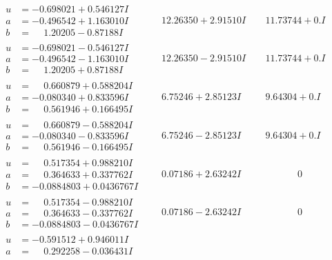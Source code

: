 \documentclass[1p]{elsarticle_modified}
\theoremstyle{definition}
\begin{document}
$$\begin{array}{c|c|c}
\begin{aligned}
u &= -0.698021 + 0.546127 I \\
a &= -0.496542 + 1.163010 I \\
b &= \phantom{-}1.20205 - 0.87188 I\end{aligned}
 & \phantom{-}12.26350 + 2.91510 I & \phantom{-}11.73744 + 0. I\phantom{ +0.000000I} \\ \hline\begin{aligned}
u &= -0.698021 - 0.546127 I \\
a &= -0.496542 - 1.163010 I \\
b &= \phantom{-}1.20205 + 0.87188 I\end{aligned}
 & \phantom{-}12.26350 - 2.91510 I & \phantom{-}11.73744 + 0. I\phantom{ +0.000000I} \\ \hline\begin{aligned}
u &= \phantom{-}0.660879 + 0.588204 I \\
a &= -0.080340 + 0.833596 I \\
b &= \phantom{-}0.561946 + 0.166495 I\end{aligned}
 & \phantom{-}6.75246 + 2.85123 I & \phantom{-}9.64304 + 0. I\phantom{ +0.000000I} \\ \hline\begin{aligned}
u &= \phantom{-}0.660879 - 0.588204 I \\
a &= -0.080340 - 0.833596 I \\
b &= \phantom{-}0.561946 - 0.166495 I\end{aligned}
 & \phantom{-}6.75246 - 2.85123 I & \phantom{-}9.64304 + 0. I\phantom{ +0.000000I} \\ \hline\begin{aligned}
u &= \phantom{-}0.517354 + 0.988210 I \\
a &= \phantom{-}0.364633 + 0.337762 I \\
b &= -0.0884803 + 0.0436767 I\end{aligned}
 & \phantom{-}0.07186 + 2.63242 I & \phantom{-0.000000 } 0 \\ \hline\begin{aligned}
u &= \phantom{-}0.517354 - 0.988210 I \\
a &= \phantom{-}0.364633 - 0.337762 I \\
b &= -0.0884803 - 0.0436767 I\end{aligned}
 & \phantom{-}0.07186 - 2.63242 I & \phantom{-0.000000 } 0 \\ \hline\begin{aligned}
u &= -0.591512 + 0.946011 I \\
a &= \phantom{-}0.292258 - 0.036431 I \\

\end{aligned}
\end{array}$$
\end{document}
